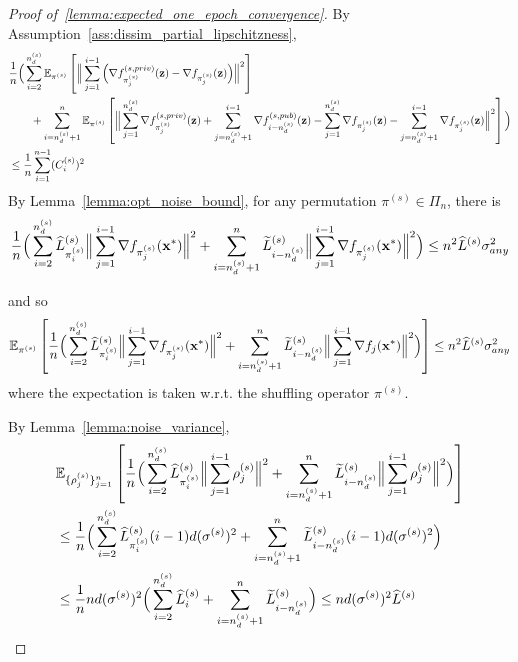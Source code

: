 \begin{proof}[Proof of~\ref{lemma:expected_one_epoch_convergence}]
    By Assumption~\ref{ass:dissim_partial_lipschitzness},
    \begin{align}
        & \frac{1}{n}\Big( \sum_{i=2}^{n_d^{(s)}}
        \mathbb{E}_{\pi^{(s)}}\left[ \Big\| \sum_{j=1}^{i-1} \Big( \nabla f_{\pi_j^{(s)}}^{(s, priv)}({\mathbf{z}}) - \nabla f_{\pi_j^{(s)}}({\mathbf{z}})\Big) \Big\|^2\right]
        \\
        \nonumber
        &\quad \quad + \sum_{i=n_d^{(s)} + 1}^{n} \mathbb{E}_{\pi^{(s)}}\left[\Big\| \sum_{j=1}^{n_d^{(s)}} \nabla f_{\pi_j^{(s)}}^{(s, priv)}({\mathbf{z}}) + \sum_{j=n_d^{(s)}+1}^{i-1} \nabla f_{i-n_d^{(s)}}^{(s, pub)}({\mathbf{z}})
            - \sum_{j=1}^{n_d^{(s)}} \nabla f_{\pi_j^{(s)}}({\mathbf{z}}) - \sum_{j=n_d^{(s)}+1}^{i-1} \nabla f_{\pi_j^{(s)}}({\mathbf{z}})
        \Big\|^2\right]
        \Big)\\
    \nonumber
    &\leq \frac{1}{n}\sum_{i=1}^{n-1} (C_i^{(s)})^2
    \end{align}
    By Lemma~\ref{lemma:opt_noise_bound}, for any permutation $\pi^{(s)}\in \Pi_{n}$, there is
    \begin{align}
        \frac{1}{n} \Big(\sum_{i=2}^{n_d^{(s)}}\widehat{L}_{\pi_i^{(s)}}^{(s)}\Big\| \sum_{j=1}^{i-1} \nabla f_{\pi_j^{(s)}}({\mathbf{x}}^*)\Big\|^2
        + \sum_{i=n_d^{(s)}+1}^{n}\widetilde{L}_{i-n_d^{(s)}}^{(s)}\Big\| \sum_{j=1}^{i-1} \nabla f_{\pi_j^{(s)}}({\mathbf{x}}^*)\Big\|^2 \Big)
        \leq n^2 \widehat{L}^{(s)} \sigma_{any}^2
    \end{align}

    and so
    \begin{align}
        \mathbb{E}_{\pi^{(s)}}\left[ \frac{1}{n} \Big( \sum_{i=2}^{n_d^{(s)}}\widehat{L}_{\pi_i^{(s)}}^{(s)}\Big\| \sum_{j=1}^{i-1} \nabla f_{\pi_j^{(s)}}({\mathbf{x}}^*)\Big\|^2
        + \sum_{i=n_d^{(s)}+1}^{n}\widetilde{L}_{i-n_d^{(s)}}^{(s)}\Big\| \sum_{j=1}^{i-1} \nabla f_j({\mathbf{x}}^*)\Big\|^2 \Big)
        \right]
        \leq n^2 \widehat{L}^{(s)} \sigma_{any}^2
    \end{align}
    where the expectation is taken w.r.t. the shuffling operator $\pi^{(s)}$.

    By Lemma~\ref{lemma:noise_variance},
    \begin{align}
        &\mathbb{E}_{\{\rho_j^{(s)}\}_{j=1}^{n}}\left[
            \frac{1}{n}\Big(\sum_{i=2}^{n_d^{(s)}} \widehat{L}_{\pi_i^{(s)}}^{(s)} \Big\| \sum_{j=1}^{i-1} \rho_j^{(s)}\Big\|^2
            + \sum_{i=n_d^{(s)}+1}^{n} \widetilde{L}_{i-n_d^{(s)}}^{(s)}\Big\| \sum_{j=1}^{i-1} \rho_j^{(s)}\Big\|^2\Big)
        \right]\\
        \nonumber
        &\leq \frac{1}{n}\Big( \sum_{i=2}^{n_d^{(s)}} \widehat{L}_{\pi_i^{(s)}}^{(s)} (i-1) d (\sigma^{(s)})^2 + \sum_{i=n_d^{(s)}+1}^{n} \widetilde{L}_{i-n_d^{(s)}}^{(s)}(i-1) d (\sigma^{(s)})^2 \Big) \\
        &\leq \frac{1}{n} n d (\sigma^{(s)})^2 \Big(\sum_{i=2}^{n_d^{(s)}}\widehat{L}_i^{(s)} + \sum_{i=n_d^{(s)}+1}^{n} \widetilde{L}_{i-n_d^{(s)}}^{(s)} \Big)
        \leq n d (\sigma^{(s)})^2 \widehat{L}^{(s)}
    \end{align}


\end{proof}
